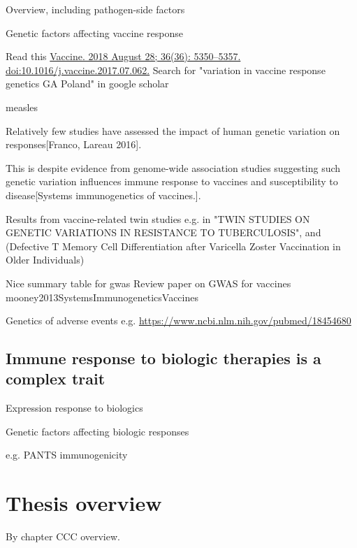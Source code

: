 \begin{outline}
    Overview, including pathogen-side factors

Genetic factors affecting vaccine response


    Read this \url{Vaccine. 2018 August 28; 36(36): 5350–5357. doi:10.1016/j.vaccine.2017.07.062.}
    Search for "variation in vaccine response genetics GA Poland" in google scholar



    measles

    Relatively few studies have assessed the impact of human genetic variation on responses[Franco, Lareau 2016].

    This is despite evidence from genome-wide association studies suggesting such genetic variation influences immune response to vaccines and susceptibility to disease[Systems immunogenetics of vaccines.].

    Results from vaccine-related twin studies e.g. in "TWIN STUDIES ON GENETIC VARIATIONS IN RESISTANCE TO TUBERCULOSIS", and (Defective T Memory Cell Differentiation after Varicella Zoster Vaccination in Older Individuals)

    Nice summary table for gwas 
    Review paper on GWAS for vaccines mooney2013SystemsImmunogeneticsVaccines

    Genetics of adverse events e.g. \url{https://www.ncbi.nlm.nih.gov/pubmed/18454680}

\subsection{Immune response to biologic therapies is a complex trait}

Expression response to biologics

Genetic factors affecting biologic responses

e.g. PANTS immunogenicity

\section{Thesis overview}

By chapter CCC overview.

\end{outline}

